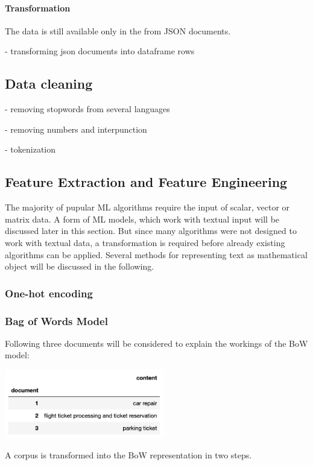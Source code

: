 	\paragraph{Transformation}
	The data is still available only in the from \ac{JSON} documents.
	
	- transforming json documents into dataframe rows
	
	
	\subsection{Data cleaning}
	- removing stopwords from several languages
	
	- removing numbers and interpunction
	
	- tokenization
	
	\subsection{Feature Extraction and Feature Engineering}
	The majority of pupular ML algorithms require the input of scalar, vector or matrix data. A form of ML models, which work with textual input will be discussed later in this section. 
	But since many algorithms were not designed to work with textual data, a transformation is required before already existing algorithms can be applied. Several methods for representing text as mathematical object will be discussed in the following.

		\subsubsection{One-hot encoding}
		

		\subsubsection{Bag of Words Model}
		Following three documents will be considered to explain the workings of the \ac{BoW} model:

		\includegraphics[height=3cm]{Bilder/corpus_bow.png}
		
		A corpus is transformed into the \ac{BoW} representation in two steps. 
		
